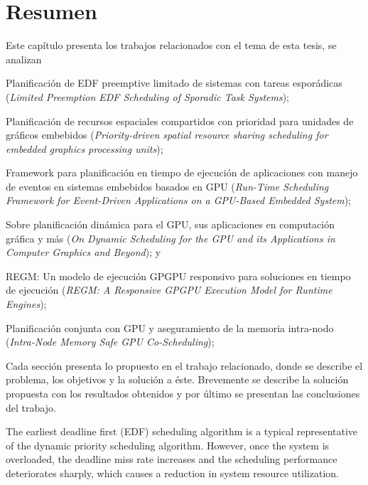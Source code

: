 \section{Resumen}
Este capítulo presenta los trabajos relacionados con el tema de esta tesis, se analizan 
\begin{inparaenum}
	\item Planificación de EDF preemptive limitado de sistemas con tareas esporádicas
	 (\textit{Limited Preemption EDF Scheduling of Sporadic Task Systems});
	 \item Planificación de recursos espaciales compartidos con prioridad para unidades de gráficos embebidos 
	 (\textit{Priority-driven spatial resource sharing scheduling for embedded graphics processing units});
	\item Framework para planificación en tiempo de ejecución de aplicaciones con manejo de eventos en sistemas embebidos basados en GPU 
	(\textit{Run-Time Scheduling Framework for Event-Driven Applications on a GPU-Based Embedded System});
	\item Sobre planificación dinámica para el GPU, sus aplicaciones en computación gráfica y más
	(\textit{On Dynamic Scheduling for the GPU and its Applications in Computer Graphics and Beyond}); y
	\item REGM: Un modelo de ejecución GPGPU responsivo para soluciones en tiempo de ejecución
	(\textit{REGM: A Responsive GPGPU Execution Model for Runtime Engines});
    	\item Planificación conjunta con GPU y aseguramiento de la memoria intra-nodo 
	(\textit{Intra-Node Memory Safe GPU Co-Scheduling});
 \end{inparaenum}

\vspace{0.3cm}
Cada sección presenta lo propuesto en el trabajo relacionado, donde se describe el problema, los objetivos y la solución a éste. Brevemente se describe la solución propuesta con los resultados obtenidos y por último se presentan las conclusiones del trabajo.





The earliest deadline first (EDF) scheduling algorithm is a typical representative of the dynamic priority scheduling algorithm. However, once the system is overloaded, the deadline miss rate increases and the scheduling performance deteriorates sharply, which causes a reduction in system resource utilization.

